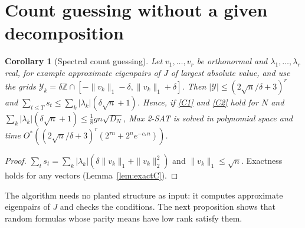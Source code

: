 \documentclass[11pt,a4paper]{article}
\newtheorem{corollary}[theorem]{Corollary}
\theoremstyle{definition}
\theoremstyle{remark}
\newcommand{\Ostar}{O^{*}}
\begin{document}
\section{Count guessing without a given decomposition}\label{sec:spectral}

\begin{corollary}[Spectral count guessing]\label{cor:spectral}
Let $v_1,\dots,v_r$ be orthonormal and $\lambda_1,\dots,\lambda_r$ real, for
example approximate eigenpairs of $J$ of largest absolute value, and use the grids
$\mathcal Y_k=\delta\mathbb Z\cap[-\|v_k\|_1-\delta,\|v_k\|_1+\delta]$. Then
$|\mathcal Y|\le(2\sqrt n/\delta+3)^r$ and
$\sum_{t\le T}s_t\le\sum_k|\lambda_k|(\delta\sqrt n+1)$. Hence, if \eqref{C1}
and \eqref{C2} hold for $N$ and
$\sum_k|\lambda_k|(\delta\sqrt n+1)\le\frac18gn\sqrt{D_N}$, Max 2-SAT is solved in
polynomial space and time $\Ostar((2\sqrt n/\delta+3)^r(2^{\tau n}+2^ne^{-c_*n}))$.
\end{corollary}
\begin{proof}
$\sum_ts_t=\sum_k|\lambda_k|(\delta\|v_k\|_1+\|v_k\|_2^2)$ and
$\|v_k\|_1\le\sqrt n$. Exactness holds for any vectors (Lemma~\ref{lem:exactC}).
\end{proof}

The algorithm needs no planted structure as input: it computes approximate
eigenpairs of $J$ and checks the conditions. The next proposition shows that
random formulas whose parity means have low rank satisfy them.
\end{document}
